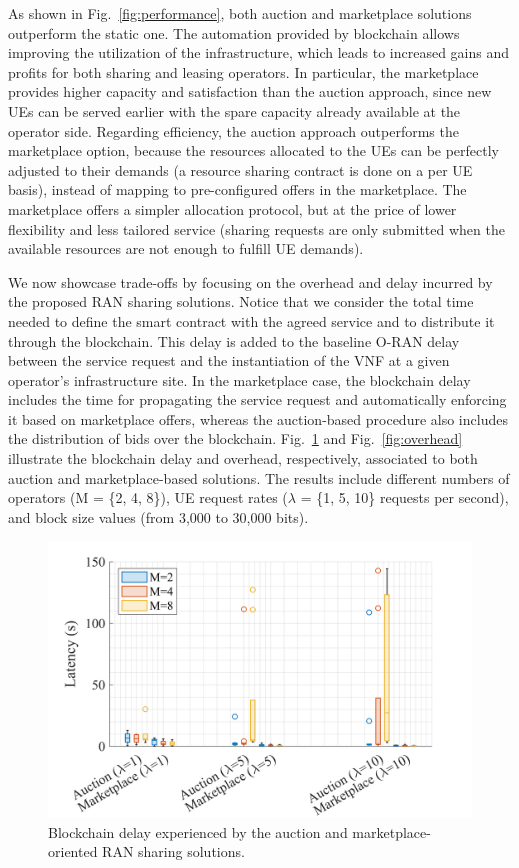 \documentclass[journal]{IEEEtran}
\begin{document}
	As shown in Fig.~\ref{fig:performance}, both auction and marketplace solutions outperform the static one. The automation provided by blockchain allows improving the utilization of the infrastructure, which leads to increased gains and profits for both sharing and leasing operators. In particular, the marketplace provides higher capacity and satisfaction than the auction approach, since new UEs can be served earlier with the spare capacity already available at the operator side. Regarding efficiency, the auction approach outperforms the marketplace option, because the resources allocated to the UEs can be perfectly adjusted to their demands (a resource sharing contract is done on a per UE basis), instead of mapping to pre-configured offers in the marketplace. The marketplace offers a simpler allocation protocol, but at the price of lower flexibility and less tailored service (sharing requests are only submitted when the available resources are not enough to fulfill UE demands).
	
	We now showcase trade-offs by focusing on the overhead and delay incurred by the proposed RAN sharing solutions. Notice that we consider the total time needed to define the smart contract with the agreed service and to distribute it through the blockchain. This delay is added to the baseline O-RAN delay between the service request and the instantiation of the VNF at a given operator's infrastructure site. In the marketplace case, the blockchain delay includes the time for propagating the service request and automatically enforcing it based on marketplace offers, whereas the auction-based procedure also includes the distribution of bids over the blockchain. Fig.~\ref{fig:delay} and Fig.~\ref{fig:overhead} illustrate the blockchain delay and overhead, respectively, associated to both auction and marketplace-based solutions. The results include different numbers of operators (M = \{2, 4, 8\}), UE request rates ($\lambda$ = \{1, 5, 10\} requests per second), and block size values (from 3,000 to 30,000 bits).
	
	\begin{figure}[ht!]
		\centering
		\includegraphics[width=.85\linewidth]{delay_new.png}
		\caption{Blockchain delay experienced by the auction and marketplace-oriented RAN sharing solutions.}
		\label{fig:delay}
	\end{figure}
	
\end{document}
